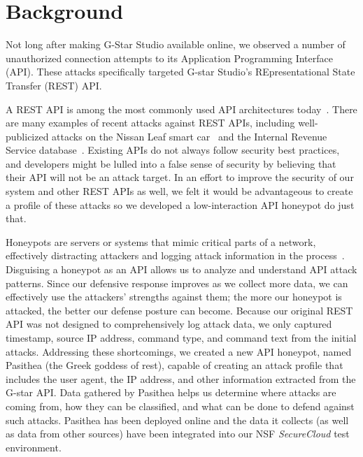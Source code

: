 
\section{Background} \label{background}

Not long after making G-Star Studio available online, we observed a number of unauthorized connection attempts to its Application Programming Interface (API).  
These attacks specifically targeted G-star Studio's REpresentational State Transfer (REST) API.

A REST API is among the most commonly used API architectures today~\cite{REST-API-use}.
There are many examples of recent attacks against REST APIs, including well-publicized attacks on the Nissan Leaf smart car~\cite{Nissan-Leaf} and the Internal Revenue Service database~\cite{IRS}.  
Existing APIs do not always follow security best practices, and developers might be lulled into a false sense of security by believing that their API will not be an attack target.  
In an effort to improve the security of our system and other REST APIs as well, we felt it would be advantageous to create a profile of these attacks so we developed a low-interaction API honeypot do just that.


Honeypots are servers or systems that mimic critical parts of a network, effectively distracting attackers and logging attack information in the process~\cite{honeypot-Def}.
Disguising a honeypot as an API allows us to analyze and understand API attack patterns.
Since our defensive response improves as we collect more data, we can effectively use the attackers' strengths against them; the more our honeypot is attacked, the better our defense posture can become.
Because our original REST API was not designed to comprehensively log attack data, we only captured timestamp, source IP address, command type, and command text from the initial attacks.  
Addressing these shortcomings, we created a new API honeypot, named Pasithea (the Greek goddess of rest), capable of creating an attack profile that includes the user agent, the IP address, and other information extracted from the G-star API.
Data gathered by Pasithea helps us determine where attacks are coming from, how they can be classified, and what can be done to defend against such attacks.  
Pasithea has been deployed online and the data it collects (as well as data from other sources) have been integrated into our NSF {\em SecureCloud} test environment.  


